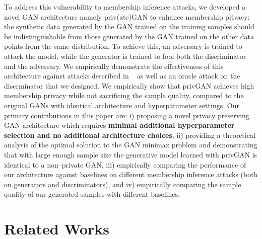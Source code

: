 \documentclass{article}
\begin{document}
To address this vulnerability to membership inference attacks, we developed a novel GAN architecture namely priv(ate)GAN to enhance membership privacy: the synthetic data generated by the GAN trained on the training samples should be indistinguishable from those generated by the GAN trained on the other data points from the same distribution. To achieve this, an adversary is trained to attack the model, while the generator is trained to fool both the discriminator and the adversary. We empirically demonstrate the effectiveness of this architecture against attacks described in ~\cite{hayes2019logan,hilprecht2019monte} as well as an oracle attack on the discrminator that we designed. We empirically show that privGAN achieves high membership privacy while not sacrificing the sample quality, compared to the original GANs with identical architecture and hyperparameter settings. Our primary contributions in this paper are: i) proposing a novel privacy preserving GAN architecture which requires \textbf{minimal additional hyperparameter selection and no additional architecture choices}, ii) providing a theoretical analysis of the optimal solution to the GAN minimax problem and demonstrating that with large enough sample size the generative model learned with privGAN is identical to a non--private GAN, iii) empirically comparing the performance of our architecture against baselines on different membership inference attacks (both on generators and discriminators), and iv) empirically comparing the sample quality of our generated samples with different baselines.


\section{Related Works}
\end{document}
